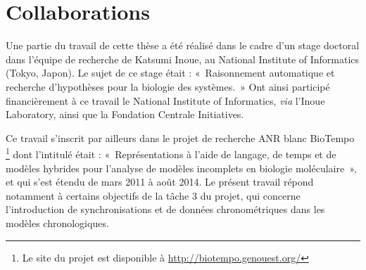 
\section{Collaborations}

Une partie du travail de cette thèse a été réalisé dans le cadre d'un stage doctoral
dans l'équipe de recherche de Katsumi Inoue,
au National Institute of Informatics (Tokyo, Japon).
Le sujet de ce stage était :
«~Raisonnement automatique et recherche d'hypothèses pour la biologie des systèmes.~»
Ont ainsi participé financièrement à ce travail le National Institute of Informatics,
\textit{via} l'Inoue Laboratory,
ainsi que la Fondation Centrale Initiatives.

Ce travail s'inscrit par ailleurs dans le projet de recherche ANR blanc BioTempo%
\footnote{Le site du projet est disponible à \url{http://biotempo.genouest.org/}}
dont l'intitulé était : «~Représentations à l'aide de langage, de temps et de modèles hybrides
pour l'analyse de modèles incomplets en biologie moléculaire~»,
et qui s'est étendu de mars 2011 à août 2014.
Le présent travail répond notamment à certains objectifs de la tâche 3 du projet,
qui concerne l'introduction de synchronisations et de données chronométriques
dans les modèles chronologiques.
